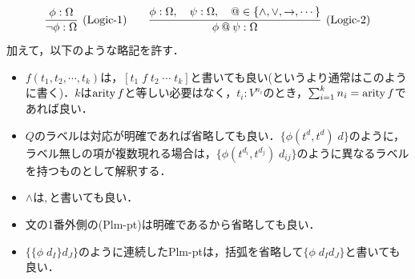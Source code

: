\documentclass[../../main-detail.tex]{subfiles}
\begin{document}
\begin{definition}[基本体系の文法]
    \[
    \infer[\text{(Logic-1)}]{
         \lnot\phi: \Omega
    }{
         \phi: \Omega
    }
    \qquad
    \infer[\text{(Logic-2)}]{
         \phi \mathbin{@} \psi: \Omega
    }{
         \phi: \Omega,\quad  \psi: \Omega,\quad @\in \{\land, \lor, \to, \cdots\}
    }
    \]
    加えて，以下のような略記を許す．
    \begin{itemize}
        \item $f(t_1,t_2,\cdots,t_k)$は，$[t_1\; f\; t_2\; \cdots\; t_k]$と書いても良い(というより通常はこのように書く)．$k$は$\mathop{\mathrm{arity}} f$と等しい必要はなく，$t_i : V^{n_i}$のとき，$\sum_{i=1}^k n_i = \mathop{\mathrm{arity}} f$であれば良い．
        \item $Q$のラベルは対応が明確であれば省略しても良い．$\{\phi(t^{d}, t^{d})\; d\}$のように，ラベル無しの項が複数現れる場合は，$\{\phi(t^{d_i}, t^{d_j})\; d_{ij}\}$のように異なるラベルを持つものとして解釈する．
        \item $\land$は$,$と書いても良い．
        \item 文の1番外側の(Plm-pt)は明確であるから省略しても良い．
        \item $\{\{\phi\; d_{I}\}d_{J}\}$のように連続したPlm-ptは，括弧を省略して$\{\phi\; d_{I}d_{J}\}$と書いても良い．
    \end{itemize}
\end{definition}
\end{document}
